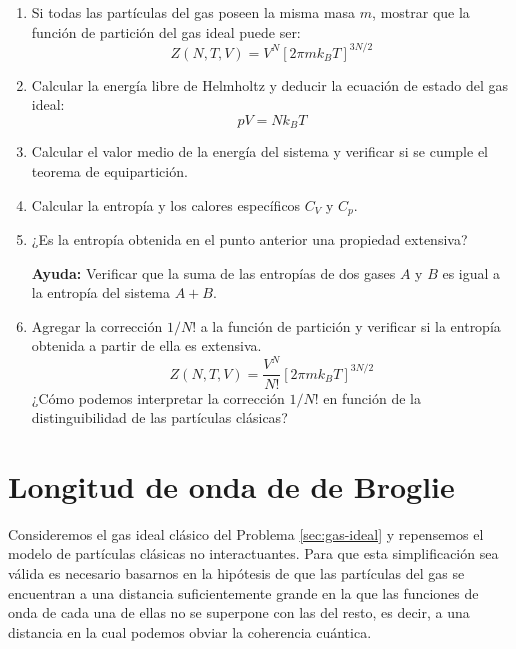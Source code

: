 \documentclass[a4paper,11pt]{article}
\begin{document}
\begin{enumerate}[label=(\alph*),
                  leftmargin=2\parindent,
                  rightmargin=2\parindent]

    \item{\label{item:gas-ideal-particion}
          Si todas las partículas del gas poseen la misma masa $m$, 
          mostrar que la función de partición del gas ideal puede ser:
          $$ Z(N, T, V) = V^N \left[ 2\pi m k_B T \right]^{3N/2} $$
          }

    \item{Calcular la energía libre de Helmholtz y deducir la ecuación de
          estado del gas ideal:
          $$ pV = N k_B T $$
          }
    
    \item{Calcular el valor medio de la energía del sistema y 
          verificar si se cumple el teorema de equipartición.
          }

    \item{Calcular la entropía y los calores específicos $C_V$ y $C_p$.
          }
    
    \item{¿Es la entropía obtenida en el punto anterior una propiedad 
          extensiva?
          }
    
    {\small
    \textbf{Ayuda:} Verificar que la suma de las entropías de dos 
    gases $A$ y $B$ es igual a la entropía del sistema $A + B$.
    }
    
    \item{Agregar la corrección $1/N!$ a la función de partición y 
          verificar si la entropía obtenida a partir de ella es extensiva.
          $$ Z(N, T, V) = \frac{V^N}{N!} \left[ 2\pi m k_B T \right]^{3N/2} $$
          ¿Cómo podemos interpretar la corrección $1/N!$ en función 
          de la distinguibilidad de las partículas clásicas?
          }

\end{enumerate}


\section{Longitud de onda de de Broglie}
\label{sec:de-broglie}

Consideremos el gas ideal clásico del Problema \ref{sec:gas-ideal} y 
repensemos el modelo de partículas clásicas no interactuantes. Para que esta 
simplificación sea válida es necesario basarnos en la hipótesis de que las 
partículas del gas se encuentran a una distancia suficientemente grande en la 
que las funciones de onda de cada una de ellas no se superpone con las del 
resto, es decir, a una distancia en la cual podemos obviar la coherencia 
cuántica.
\end{document}
